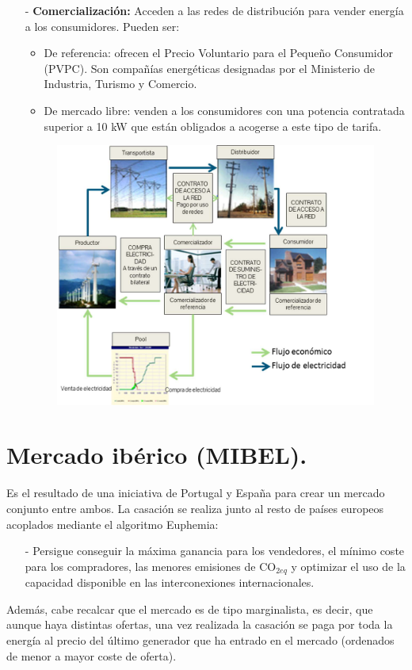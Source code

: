 \begin{itemize}
	
	\item [-] \textbf{Comercialización:} Acceden a las redes de distribución para vender energía a los consumidores. Pueden ser:
	\begin{itemize}
		\item De referencia: ofrecen el Precio Voluntario para el Pequeño Consumidor (PVPC). Son compañías energéticas designadas por el Ministerio de Industria, Turismo y Comercio.
		\item De mercado libre: venden a los consumidores con una potencia contratada superior a 10 kW  que están obligados a acogerse a este tipo de tarifa.
	\end{itemize}
\begin{figure}[H]
	\centering
	\includegraphics[width=0.7\linewidth]{res/tema4/diagramaPochoAdrikun2}
	\label{fig:diagramapochoadrikun2}
\end{figure}

\end{itemize}
\section{Mercado ibérico (MIBEL).} 
Es el resultado de una iniciativa de Portugal y España para crear un mercado conjunto entre ambos. La casación se realiza junto al resto de países europeos acoplados mediante el algoritmo Euphemia:
\begin{itemize}
	\item [-] Persigue conseguir la máxima ganancia para los vendedores, el mínimo coste
	para los compradores, las menores emisiones de CO$_{2eq}$ y optimizar el uso
	de la capacidad disponible en las interconexiones internacionales.
\end{itemize}

Además, cabe recalcar que el mercado es de tipo marginalista, es decir, que aunque haya distintas ofertas, una vez realizada la casación se paga por toda la energía al precio del último generador que ha entrado en el mercado (ordenados de menor a mayor coste de oferta).
